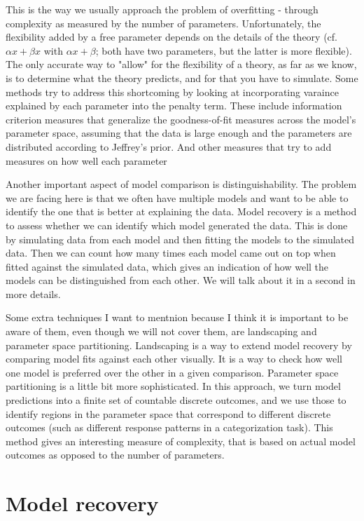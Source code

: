 \documentclass[12pt]{article}
\begin{document}
This is the way we usually approach the problem of overfitting - through complexity as measured by the number of parameters. Unfortunately, the flexibility added by a free parameter depends on the details of the theory (cf. $\alpha x + \beta x$ with $\alpha x + \beta$; both have two parameters, but the latter is more flexible). The only accurate way to "allow" for the flexibility of a theory, as far as we know, is to determine what the theory predicts, and for that you have to simulate. Some methods try to address this shortcoming by looking at incorporating varaince explained by each parameter into the penalty term. These include information criterion measures that generalize the goodness-of-fit measures across the model's parameter space, assuming that the data is large enough and the parameters are distributed according to Jeffrey's prior. And other measures that try to add measures on how well each parameter 

Another important aspect of model comparison is distinguishability. The problem we are facing here is that we often have multiple models and want to be able to identify the one that is better at explaining the data. Model recovery is a method to assess whether we can identify which model generated the data. This is done by simulating data from each model and then fitting the models to the simulated data. Then we can count how many times each model came out on top when fitted against the simulated data, which gives an indication of how well the models can be distinguished from each other. We will talk about it in a second in more details.

Some extra techniques I want to mentnion because I think it is important to be aware of them, even though we will not cover them, are landscaping and parameter space partitioning. Landscaping is a way to extend model recovery by comparing model fits against each other visually. It is a way to check how well one model is preferred over the other in a given comparison. Parameter space partitioning is a little bit more sophisticated. In this approach, we turn model predictions into a finite set of countable discrete outcomes, and we use those to identify regions in the parameter space that correspond to different discrete outcomes (such as different response patterns in a categorization task). This method gives an interesting measure of complexity, that is based on actual model outcomes as opposed to the number of parameters.

\section{Model recovery}
\end{document}
